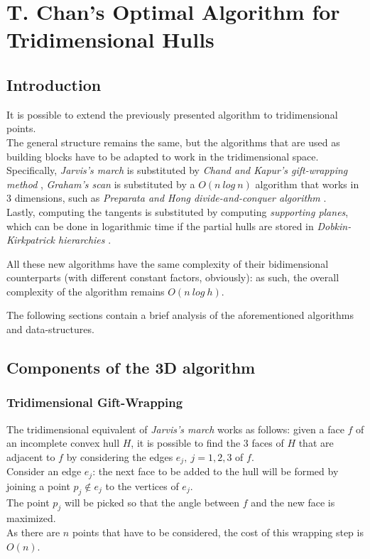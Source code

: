 \documentclass[
12pt,
a4paper,
oneside,
headinclude,
footinclude]{report}
\theoremstyle{definition} %
\begin{document}
\chapter{T. Chan's Optimal Algorithm for Tridimensional Hulls}
\section{Introduction}
It is possible to extend the previously presented algorithm to tridimensional points.\\
The general structure remains the same, but the algorithms that are used as building blocks have to be adapted to work in the tridimensional space.\\
Specifically, \textit{Jarvis's march} is substituted by \textit{Chand and Kapur's gift-wrapping method} \cite{gift_wrapping_3d}, \textit{Graham's scan} is substituted by a $O(n\ log\ n)$ algorithm that works in 3 dimensions, such as \textit{Preparata and Hong divide-and-conquer algorithm} \cite{Preparata:1977:CHF:359423.359430}.\\ Lastly, computing the tangents is substituted by computing \textit{supporting planes}, which can be done in logarithmic time if the partial hulls are stored in \textit{Dobkin-Kirkpatrick hierarchies} \cite{Ericson:2004:RCD:1121584}.

All these new algorithms have the same complexity of their bidimensional counterparts (with different constant factors, obviously): as such, the overall complexity of the algorithm remains $O(n\ log\ h)$.

The following sections contain a brief analysis of the aforementioned algorithms and data-structures.

\section{Components of the 3D algorithm}

\subsection{Tridimensional Gift-Wrapping}
The tridimensional equivalent of \textit{Jarvis's march} works as follows:
given a face $f$ of an incomplete convex hull $H$, it is possible to find the 3 faces of $H$ that are adjacent to $f$ by considering the edges $e_j,\ j = 1,2,3$ of $f$.\\
Consider an edge $e_j$: the next face to be added to the hull will be formed by joining a point $p_j \notin e_j$ to the vertices of $e_j$.\\
The point $p_j$ will be picked so that the angle between $f$ and the new face is maximized. \\
As there are $n$ points that have to be considered, the cost of this wrapping step is $O(n)$.\\
\end{document}
